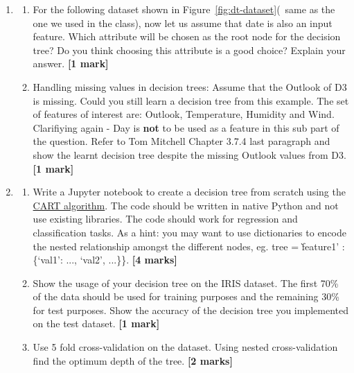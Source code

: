 \documentclass[colorlinks]{article}
\begin{document}
\begin{enumerate}
	\item 	\begin{enumerate}
		\item For the following dataset shown in Figure~\ref{fig:dt-dataset}(~same as the one we used in the class), now let us assume that date is also an input feature. Which attribute will be chosen as the root node for the decision tree? Do you think choosing this attribute is a good choice? Explain your answer.  \textbf{[1 mark]}
		\item Handling missing values in decision trees: Assume that the Outlook of D3 is missing. Could you still learn a decision tree from this example. The set of features of interest are: Outlook, Temperature, Humidity and Wind. Clarifiying again - Day is \textbf{not} to be used as a feature in this sub part of the question. Refer to Tom Mitchell Chapter 3.7.4 last paragraph and show the learnt decision tree despite the missing Outlook values from D3.  \textbf{[1 mark]}
	\end{enumerate}



\item 	\begin{enumerate}
	

	
		\item Write a Jupyter notebook to create a decision tree from scratch using the \href{https://www.stat.wisc.edu/~loh/treeprogs/guide/wires11.pdf}{CART algorithm}. The code should be written in native Python and not use existing libraries. The code should work for regression and classification tasks. As a hint: you may want to use dictionaries to encode the nested relationship amongst the different nodes, eg. tree = \`feature1' :\{`val1': ..., `val2', ...\}\}. \textbf{[4 marks]}
		\item Show the usage of your decision tree on the IRIS dataset. The first 70\% of the data should be used for training purposes and the remaining 30\% for test purposes. Show the accuracy of the decision tree you implemented on the test dataset. \textbf{[1 mark]}
		\item Use 5 fold cross-validation on the dataset. Using nested cross-validation find the optimum depth of the tree. \textbf{[2 marks]}
	\end{enumerate} 
	

\end{enumerate}
\end{document}
